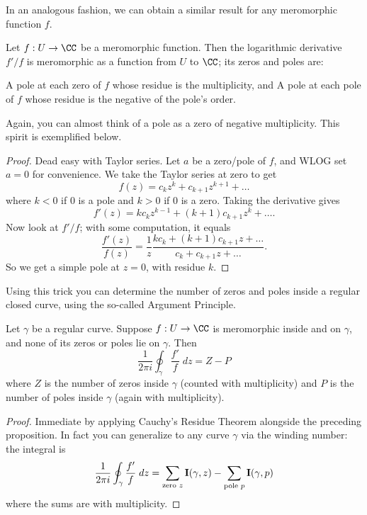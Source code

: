 In an analogous fashion, we can obtain a similar result for any meromorphic function $f$.
\begin{proposition}
	Let $f : U \to \CC$ be a meromorphic function.
	Then the logarithmic derivative $f'/f$ is meromorphic as a function from $U$ to $\CC$;
	its zeros and poles are:
	\begin{enumerate}[(i)]
		\ii A pole at each zero of $f$ whose residue is the multiplicity, and
		\ii A pole at each pole of $f$ whose residue is the negative of the pole's order.
	\end{enumerate}
\end{proposition}
Again, you can almost think of a pole as a zero of negative multiplicity.
This spirit is exemplified below.
\begin{proof}
	Dead easy with Taylor series.
	Let $a$ be a zero/pole of $f$, and WLOG set $a=0$ for convenience.
	We take the Taylor series at zero to get
	\[ f(z) = c_kz^k + c_{k+1}z^{k+1} + \dots \]
	where $k < 0$ if $0$ is a pole and $k > 0$ if $0$ is a zero.
	Taking the derivative gives
	\[ f'(z) = kc_k z^{k-1} + (k+1)c_{k+1}z^{k} + \dots. \]
	Now look at $f'/f$; with some computation, it equals
	\[
		\frac{f'(z)}{f(z)}
		= \frac 1z \frac{kc_k + (k+1)c_{k+1}z + \dots}{c_k + c_{k+1}z + \dots}.
	\]
	So we get a simple pole at $z=0$, with residue $k$.
\end{proof}

Using this trick you can determine the number of zeros and poles inside a regular closed curve,
using the so-called Argument Principle.

\begin{theorem}
	\label{thm:arg_principle}
	Let $\gamma$ be a regular curve.
	Suppose $f : U \to \CC$ is meromorphic inside and on $\gamma$, and
	none of its zeros or poles lie on $\gamma$.
	Then
	\[
		\frac{1}{2\pi i} \oint_\gamma \frac{f'}{f} \; dz
		= Z - P
	\]
	where $Z$ is the number of zeros inside $\gamma$ (counted with multiplicity)
	and $P$ is the number of poles inside $\gamma$ (again with multiplicity).
\end{theorem}
\begin{proof}
	Immediate by applying Cauchy's Residue Theorem alongside the preceding proposition.
	In fact you can generalize to any curve $\gamma$ via the winding number:
	the integral is
	\[ \frac{1}{2\pi i} \oint_\gamma \frac{f'}{f} \; dz
		= \sum_{\text{zero $z$}} \operatorname{\mathbf I}(\gamma,z)
		- \sum_{\text{pole $p$}} \operatorname{\mathbf I}(\gamma,p) \]
	where the sums are with multiplicity.
\end{proof}

